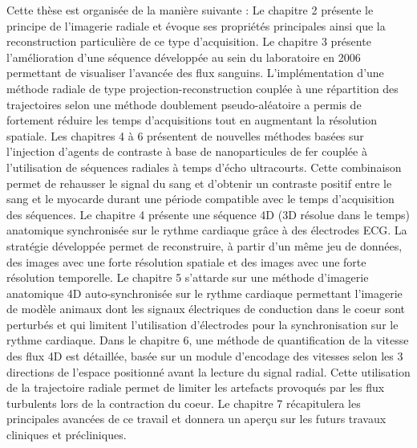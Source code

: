Cette thèse est organisée de la manière suivante : Le chapitre 2 présente le principe de l'imagerie radiale et évoque ses propriétés principales ainsi que la reconstruction particulière de ce type d'acquisition. Le chapitre 3 présente l'amélioration d'une séquence développée au sein du laboratoire en 2006 permettant de visualiser l'avancée des flux sanguins. L'implémentation d'une méthode radiale de type projection-reconstruction couplée à une répartition des trajectoires selon une méthode doublement pseudo-aléatoire a permis de fortement réduire les temps d'acquisitions tout en augmentant la résolution spatiale. 
Les chapitres 4 à 6 présentent de nouvelles méthodes basées sur l'injection d'agents de contraste à base de nanoparticules de fer couplée à l'utilisation de séquences radiales à temps d'écho ultracourts. Cette combinaison permet de rehausser le signal du sang et d'obtenir un contraste positif entre le sang et le myocarde durant une période compatible avec le temps d'acquisition des séquences. Le chapitre 4 présente une séquence 4D (3D résolue dans le temps) anatomique synchronisée sur le rythme cardiaque grâce à des électrodes ECG. La stratégie développée permet de reconstruire, à partir d'un même jeu de données, des images avec une forte résolution spatiale et des images avec une forte résolution temporelle. Le chapitre 5 s'attarde sur une méthode d'imagerie anatomique 4D auto-synchronisée sur le rythme cardiaque permettant l'imagerie de modèle animaux dont les signaux électriques de conduction dans le coeur sont perturbés et qui limitent l'utilisation d'électrodes pour la synchronisation sur le rythme cardiaque. Dans le chapitre 6, une méthode de quantification de la vitesse des flux 4D est détaillée, basée sur un module d'encodage des vitesses selon les 3 directions de l'espace positionné avant la lecture du signal radial. Cette utilisation de la trajectoire radiale permet de limiter les artefacts provoqués par les flux turbulents lors de la contraction du coeur.
Le chapitre 7 récapitulera les principales avancées de ce travail et donnera un aperçu sur les futurs travaux cliniques et précliniques.





